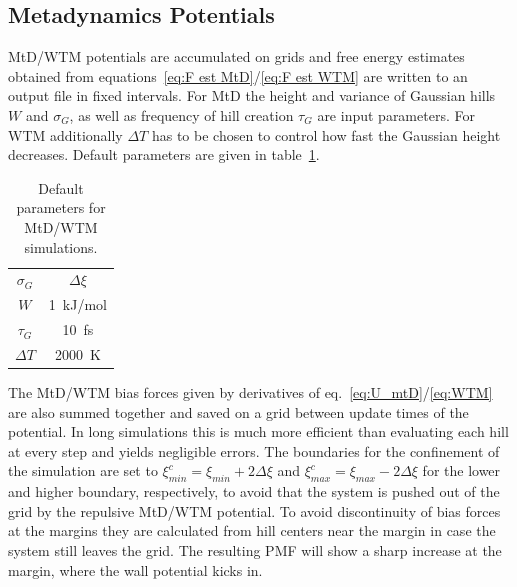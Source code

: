 \subsection{Metadynamics Potentials}
\label{subsec:implement MtD}
MtD/WTM potentials are accumulated on grids and free energy estimates obtained from equations~\ref{eq:F est MtD}/\ref{eq:F est WTM} are written to an output file in fixed intervals.
For MtD the height and variance of Gaussian hills $W$ and $\sigma_G$, as well as frequency of hill creation $\tau_G$ are input parameters. For WTM additionally $\Delta T$ has to be chosen to control how fast the Gaussian height decreases. Default parameters are given in table~\ref{tab:metaparams}.
\begin{table}[H]
      \centering
         \caption{Default parameters for MtD/WTM simulations.}
         \begin{tabular}{ c  c }
                 \hline
                  $\sigma_{G}$  & $\Delta \xi$  \\
                  $W$         & 1~kJ/mol \\
                  $\tau_G$    & 10~fs    \\
                  $\Delta T$  & 2000~K   \\
                 \hline
      \end{tabular}
      \label{tab:metaparams}
\end{table}
The MtD/WTM bias forces given by derivatives of eq.~\ref{eq:U_mtD}/\ref{eq:WTM} are also summed together and saved on a grid between update times of the potential.
In long simulations this is much more efficient than evaluating each hill at every step and yields negligible errors.\autocite{fiorin2013using}
The boundaries for the confinement of the simulation are set to
$\xi^c_{min}=\xi_{min}+2\Delta\xi$ and $\xi^c_{max}=\xi_{max}-2\Delta\xi$ for the lower and higher boundary, respectively, to avoid that the system is pushed out of the grid by the repulsive MtD/WTM potential.
To avoid discontinuity of bias forces at the margins they are calculated from hill centers near the margin in case the system still leaves the grid.
The resulting PMF will show a sharp increase at the margin, where the wall potential kicks in.

